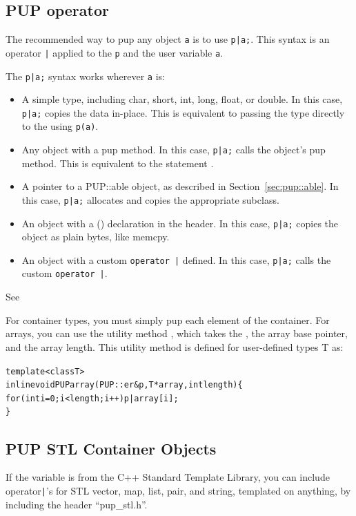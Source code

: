\subsection{PUP operator}
\label{sec:pupoperator}

The recommended way to pup any object \verb.a. is to use \verb.p|a;..
This syntax is an operator \verb.|. applied to the  \verb.p.
and the user variable \verb.a..

The \verb.p|a;. syntax works wherever \verb.a. is:

\begin{itemize}
 \item A simple type, including char, short, int, long, float, or double.
    In this case, \verb.p|a;. copies the data in-place.
    This is equivalent to passing the type directly to the    
       using \verb.p(a)..
 \item Any object with a pup method.
    In this case, \verb.p|a;. calls the object's pup method.
    This is equivalent to the statement . 
 \item A pointer to a PUP::able object, as described in Section~\ref{sec:pup::able}.
    In this case, \verb.p|a;. allocates and copies the appropriate subclass.
 \item An object with a () declaration in the header.
    In this case, \verb.p|a;. copies the object as plain bytes, like memcpy.
 \item An object with a custom \verb.operator |. defined.
    In this case, \verb.p|a;. calls the custom \verb.operator |..
\end{itemize}

See 

For container types, you must simply pup each element of the container.
For arrays, you can use the utility method , which takes
the , the array base pointer, and the array length.
This utility method is defined for user-defined types T as:
  \begin{alltt}
    template<class T>
    inline void PUParray(PUP::er &p,T *array,int length) \{
       for (int i=0;i<length;i++) p|array[i];
    \}
  \end{alltt}


\subsection{PUP STL Container Objects}
\label{sec:pupstl}
If the variable is from the C++ Standard Template Library, you can include 
operator\verb.|.'s for STL vector, map, list, pair, and string, templated
on anything, by including the header ``pup\_stl.h''.

